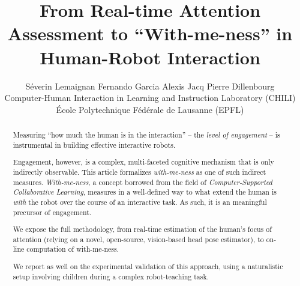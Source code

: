 \documentclass{sig-alternate}
\begin{document}
%

\title{From Real-time Attention Assessment to ``With-me-ness'' in Human-Robot Interaction}
\author{Séverin Lemaignan \qquad Fernando Garcia \qquad Alexis Jacq \qquad Pierre Dillenbourg\\Computer-Human Interaction in Learning and Instruction Laboratory (CHILI)\\École Polytechnique Fédérale de Lausanne (EPFL)}


\maketitle
\begin{abstract}

Measuring ``how much the human is in the interaction'' -- the \emph{level of
engagement} -- is instrumental in building effective interactive robots.

Engagement, however, is a complex, multi-faceted cognitive mechanism that is
only indirectly observable. This article formalizes \emph{with-me-ness} as one
of such indirect measures. \emph{With-me-ness}, a concept borrowed from the
field of {\it Computer-Supported Collaborative Learning}, measures in a
well-defined way to what extend the human is \emph{with} the robot over the
course of an interactive task. As such, it is an meaningful precursor of
engagement.

We expose the full methodology, from real-time estimation of the human's focus
of attention (relying on a novel, open-source, vision-based head pose
estimator), to on-line computation of with-me-ness.

We report as well on the experimental validation of this approach, using a
naturalistic setup involving children during a complex robot-teaching task.

\end{abstract}

\end{document}

